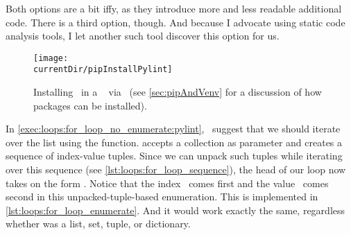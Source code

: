 Both options are a bit iffy, as they introduce more and less readable additional code.
There is a third option, though.
And because I advocate using static code analysis tools, I let another such tool discover this option for us.%
%
\begin{figure}%
\centering%
\texttt{[image: \\currentDir/pipInstallPylint]}%
\caption{Installing \pylint\ in a \ubuntu\  via \pip~(see \cref{sec:pipAndVenv} for a discussion of how packages can be installed).}%
\label{fig:pipInstallPylint}%
\end{figure}%
%
%
%
%
%
%
%
%
%
In \cref{exec:loops:for_loop_no_enumerate:pylint}, \pylint\ suggest that we should iterate over the list  using the  function.
 accepts a collection as parameter and creates a sequence of index-value tuples.
Since we can unpack such tuples while iterating over this sequence (see \cref{lst:loops:for_loop_sequence}), the head of our loop now takes on the form .
Notice that the index~ comes first and the value~ comes second in this unpacked-tuple-based enumeration.
This is implemented in \cref{lst:loops:for_loop_enumerate}.
And it would work exactly the same, regardless whether  was a list, set, tuple, or dictionary.

